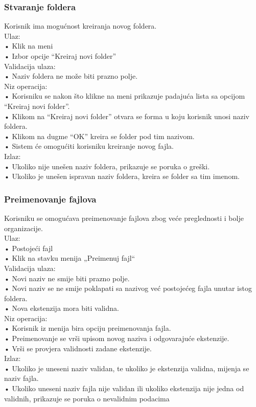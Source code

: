 \documentclass[utf8]{article}
\begin{document}
\subsubsection{Stvaranje foldera}
Korisnik ima mogućnost kreiranja novog foldera.\\
Ulaz:\\
•	Klik na meni\\
•	Izbor opcije “Kreiraj novi folder”\\
Validacija ulaza:\\
•	Naziv foldera ne može biti prazno polje.\\
Niz operacija:\\
•	Korisniku se nakon što klikne na meni prikazuje padajuća lista sa opcijom “Kreiraj novi folder”.\\
•	Klikom na “Kreiraj novi folder” otvara se forma u koju korisnik unosi naziv foldera.\\
•	Klikom na dugme “OK” kreira se folder pod tim nazivom.\\
•	Sistem će omogućiti korisniku kreiranje novog fajla.\\
Izlaz:\\
•	Ukoliko nije unešen naziv foldera, prikazuje se poruka o greški.\\
•	Ukoliko je unešen ispravan naziv foldera, kreira se folder sa tim imenom.\\
\subsubsection{Preimenovanje fajlova}
Korisniku se omogućava preimenovanje fajlova zbog veće preglednosti i bolje organizacije.\\
Ulaz:\\
•	Postojeći fajl\\
•	Klik na stavku menija „Preimenuj fajl“\\
Validacija ulaza:\\
•	Novi naziv ne smije biti prazno polje.\\
•	Novi naziv se ne smije poklapati sa nazivog već postojećeg fajla unutar istog foldera.\\
•	Nova ekstenzija mora biti validna.\\
Niz operacija:\\
•	Korisnik iz menija bira opciju preimenovanja fajla.\\
•	Preimenovanje se vrši upisom novog naziva i odgovarajuće ekstenzije.\\
•	Vrši se provjera validnosti zadane ekstenzije.\\
Izlaz:\\
•	Ukoliko je uneseni naziv validan, te ukoliko je ekstenzija validna, mijenja se naziv fajla.\\
•	Ukoliko uneseni naziv fajla nije validan ili ukoliko ekstenzija nije jedna od validnih, prikazuje se poruka o nevalidnim podacima\\
\end{document}
